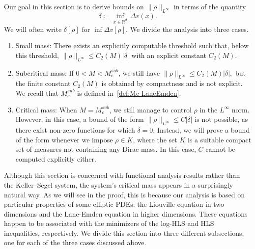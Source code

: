\documentclass[11pt,a4paper]{article}
\numberwithin{equation}{section}
\theoremstyle{plain}
\theoremstyle{remark}
\newcommand {\f}{\frac}
\begin{document}
Our goal in this section is to derive bounds on $\|\rho\|_{L^\infty}$ in terms of the quantity
\begin{equation}\label{eq:def_delta}
\delta  \coloneqq  \inf_{x \in \mathbb{R}^d}\,\Delta v(x).
\end{equation}
We will often write $\delta[\rho]$ for $\inf \Delta v[\rho]$. 
We divide the analysis into three cases.
\begin{enumerate}
\item Small mass: There exists an explicitly computable threshold
such that, below this threshold, $\|\rho\|_{L^\infty}\le C_2(M)|\delta|$
with an explicit constant $C_2(M)$.

\item Subcritical mass: If $0<M<M^{sub}_c$, we still have
$\|\rho\|_{L^\infty}\le C_2(M)|\delta|,$ but the finite constant $C_2(M)$ is obtained by compactness and is
not explicit. We recall that $M^{sub}_c$ is defined
in~\eqref{def:Mc LaneEmden}.

\item Critical mass: When $M = M^{sub}_c$, we still manage to control $\rho$ in the $L^\infty$ norm. However, in this case, a bound of the form $\|\rho\|_{L^\infty}\le C|\delta|$ is not possible, as there exist non-zero functions for which $\delta=0$. Instead, we will prove a bound of the form    whenever we impose $\rho\in K$, where the set $K$ is a suitable compact set of measures not containing any Dirac mass. In this case, $C$ cannot be computed explicitly either.
\end{enumerate}

Although this section is concerned with functional analysis results rather than the Keller--Segel system, the system’s critical mass appears in a surprisingly natural way. As we will see in the proof, this is because our analysis is based on particular properties of some elliptic PDEs: the Liouville equation in two dimensions and the Lane-Emden equation in higher dimensions. These equations happen to be associated with the minimizers of the log-HLS and HLS inequalities, respectively. We divide this section into three different subsections, one for each of the three cases discussed above.
\end{document}
